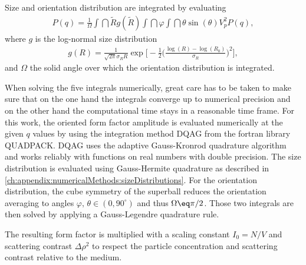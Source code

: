 \documentclass[\main/dresen_thesis.tex]{subfiles}
\begin{document}
Size and orientation distribution are integrated by evaluating
\begin{align}
P(q) = \frac{1}{\Omega}
\int \dint \tilde{R} g(\tilde{R})  \int \dint \varphi \int \dint \theta \sin (\theta) V_p^2 P(q),
\label{eq:superball_intensity_equation}
\end{align}
where $g$ is the log-normal size distribution
\begin{align}
g(R) = \frac{1}{\sqrt{2 \pi} \sigma_R R} \exp \Bigg[ - \frac{1}{2} \bigg(\frac{\log(R) - \log(R_0)}{\sigma_R} \bigg)^2 \Bigg],
\end{align}
and $\Omega$ the solid angle over which the orientation distribution is integrated.

When solving the five integrals numerically, great care has to be taken to make sure that on the one hand the integrals converge up to numerical precision and on the other hand the computational time stays in a reasonable time frame.
For this work, the oriented form factor amplitude is evaluated numerically at the given $q$ values by using the integration method DQAG from the fortran library QUADPACK.
DQAG uses the adaptive Gauss-Kronrod quadrature algorithm and works reliably with functions on real numbers with double precision.
The size distribution is evaluated using Gauss-Hermite quadrature as described in \ref{ch:appendix:numericalMethods:sizeDistributions}.
For the orientation distribution, the cube symmetry of the superball reduces the orientation averaging to angles $\varphi,\, \theta \in (0, 90 ^\circ)$ and thus $\Omega \eq \pi / 2$. Those two integrals are then solved by applying a Gauss-Legendre quadrature rule.

The resulting form factor is multiplied with a scaling constant $I_0=N/V$ and scattering contrast $\Delta \rho^2$ to respect the particle concentration and scattering contrast relative to the medium.
\end{document}
